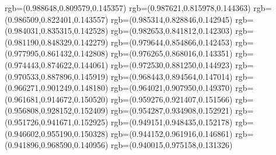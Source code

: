 {{{            rgb=(0.988648,0.809579,0.145357)
            rgb=(0.987621,0.815978,0.144363)
            rgb=(0.986509,0.822401,0.143557)
            rgb=(0.985314,0.828846,0.142945)
            rgb=(0.984031,0.835315,0.142528)
            rgb=(0.982653,0.841812,0.142303)
            rgb=(0.981190,0.848329,0.142279)
            rgb=(0.979644,0.854866,0.142453)
            rgb=(0.977995,0.861432,0.142808)
            rgb=(0.976265,0.868016,0.143351)
            rgb=(0.974443,0.874622,0.144061)
            rgb=(0.972530,0.881250,0.144923)
            rgb=(0.970533,0.887896,0.145919)
            rgb=(0.968443,0.894564,0.147014)
            rgb=(0.966271,0.901249,0.148180)
            rgb=(0.964021,0.907950,0.149370)
            rgb=(0.961681,0.914672,0.150520)
            rgb=(0.959276,0.921407,0.151566)
            rgb=(0.956808,0.928152,0.152409)
            rgb=(0.954287,0.934908,0.152921)
            rgb=(0.951726,0.941671,0.152925)
            rgb=(0.949151,0.948435,0.152178)
            rgb=(0.946602,0.955190,0.150328)
            rgb=(0.944152,0.961916,0.146861)
            rgb=(0.941896,0.968590,0.140956)
            rgb=(0.940015,0.975158,0.131326)
        }
    }
}
